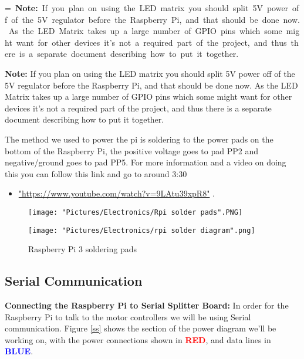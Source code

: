 \documentclass[12pt]{article}
\makeatletter
\newcommand{\mybox}[1]{%
  \setbox0=\hbox{#1}%
  \setlength{\@tempdima}{\dimexpr\wd0+13pt}%
  \begin{tcolorbox}[colframe=mycolor,boxrule=0.5pt,arc=4pt,
      left=6pt,right=6pt,top=6pt,bottom=6pt,boxsep=0pt,width=0.95\textwidth]
    #1
  \end{tcolorbox}
}
\makeatother
\begin{document}
\mybox{
\textbf{Note:} If you plan on using the LED matrix you should split 5V power off of the 5V regulator before the Raspberry Pi, and that should be done now. As the LED Matrix takes up a large number of GPIO pins which some might want for other devices it's not a required part of the project, and thus there is a separate document describing how to put it together.
} 


\noindent The method we used to power the pi is soldering to the power pads on the bottom of the Raspberry Pi, the positive voltage goes to pad PP2 and negative/ground goes to pad PP5. For more information and a video on doing this you can follow this link and go to around 3:30 
\begin{itemize}
	\item \href{"https://www.youtube.com/watch?v=9LAtu39xpR8"}{"https://www.youtube.com/watch?v=9LAtu39xpR8"} . 
\end{itemize}

\begin{figure}[H]
 	\centering
  	\begin{minipage}[b]{0.40\textwidth}
		\texttt{[image: "Pictures/Electronics/Rpi solder pads".PNG]}
  	\end{minipage}
  	\hfill
  	\begin{minipage}[b]{0.50\textwidth}
    		\texttt{[image: "Pictures/Electronics/rpi solder diagram".png]}
  	\end{minipage}
	\caption{Raspberry Pi 3 soldering pads}
	\label{rpi pads}
\end{figure}



\subsection{Serial Communication}

\textbf{Connecting the Raspberry Pi to Serial Splitter Board:} In order for the Raspberry Pi to talk to the motor controllers we will be using Serial communication. Figure \ref{ss} shows the section of the power diagram we'll be working on, with the power connections shown in \textcolor{red}{\textbf{RED}}, and data lines in \textcolor{blue}{\textbf{BLUE}}. 
\end{document}
